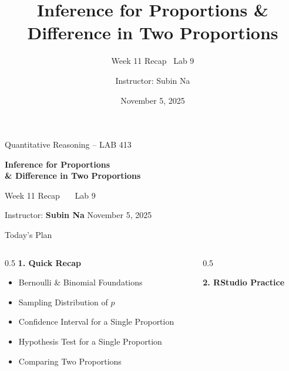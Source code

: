 \documentclass[aspectratio=169,11pt]{beamer}
\title{\bfseries Inference for Proportions \& Difference in Two Proportions}
\subtitle{Week 11 Recap \textbullet\ Lab 9}
\author{Instructor: Subin Na}
\institute{Quantitative Reasoning -- LAB 413}
\date{November 5, 2025}
\begin{document}
{
\begin{frame}
  \vfill
  {\color{qrgray}\small Quantitative Reasoning -- LAB 413}\\[0.6em]
  {\color{qrnavy}\huge\bfseries Inference for Proportions\\[0.15em]\& Difference in Two Proportions\par}
  \vspace{0.4em}
  {\color{qrblue}\large Week 11 Recap \ \textbullet\ \ Lab 9}\par
  \vspace{1.6em}
  {\color{qrgray} Instructor: \textbf{Subin Na} \hfill November 5, 2025}
  \vfill
\end{frame}
}

\begin{frame}{Today's Plan}
  \begin{columns}[T]
    \begin{column}{0.5\textwidth}
      \textbf{\color{qrnavy}1. Quick Recap}
      \begin{itemize}
        \item Bernoulli \& Binomial Foundations
        \item Sampling Distribution of $\hat{p}$
        \item Confidence Interval for a Single Proportion
        \item Hypothesis Test for a Single Proportion
        \item Comparing Two Proportions
      \end{itemize}
    \end{column}
    \begin{column}{0.5\textwidth}
      \vspace{4.2em}

      \textbf{\color{qrnavy}2. RStudio Practice}
    \end{column}
  \end{columns}
\end{frame}
\end{document}
